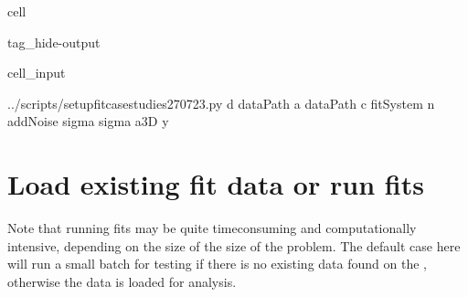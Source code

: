 \documentclass[letterpaper,table,10pt,english]{jupyterBook}
\begin{document}
\begin{sphinxuseclass}{cell}
\begin{sphinxuseclass}{tag_hide-output}\begin{sphinxVerbatimInput}

\begin{sphinxuseclass}{cell_input}
\begin{sphinxVerbatim}[commandchars=\\\{\}]

  

 \PYGZdq{}../scripts/setup\PYGZus{}fit\PYGZus{}case\PYGZhy{}studies\PYGZus{}270723.py\PYGZdq{} \PYGZhy{}d \PYGZob{}dataPath\PYGZcb{} \PYGZhy{}a \PYGZob{}dataPath\PYGZcb{} \PYGZhy{}c \PYGZob{}fitSystem\PYGZcb{} \PYGZhy{}n \PYGZob{}addNoise\PYGZcb{} \PYGZhy{}\PYGZhy{}sigma \PYGZob{}sigma\PYGZcb{} \PYGZhy{}a3D \PYGZsq{}y\PYGZsq{}
\end{sphinxVerbatim}

\end{sphinxuseclass}\end{sphinxVerbatimInput}

\end{sphinxuseclass}
\end{sphinxuseclass}

\section{Load existing fit data or run fits}
\label{\detokenize{part2/case-study-OCS_290723:load-existing-fit-data-or-run-fits}}
\sphinxAtStartPar
Note that running fits may be quite time\sphinxhyphen{}consuming and computationally intensive, depending on the size of the size of the problem. The default case here will run a small batch for testing if there is no existing data found on the , otherwise the data is loaded for analysis.
\end{document}
